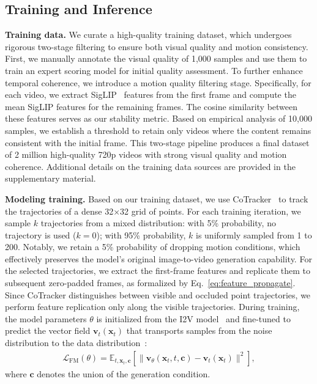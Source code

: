 \documentclass{article}
\begin{document}
\subsection{Training and Inference} \label{sec:details}
\noindent \textbf{Training data.}
We curate a high-quality training dataset, which undergoes rigorous two-stage filtering to ensure both visual quality and motion consistency. First, we manually annotate the visual quality of 1,000 samples and use them to train an expert scoring model for initial quality assessment. To further enhance temporal coherence, we introduce a motion quality filtering stage. Specifically, for each video, we extract SigLIP~\cite{zhai2023siglip} features from the first frame and compute the mean SigLIP features for the remaining frames. The cosine similarity between these features serves as our stability metric. Based on empirical analysis of 10,000 samples, we establish a threshold to retain only videos where the content remains consistent with the initial frame. This two-stage pipeline produces a final dataset of 2 million high-quality 720p videos with strong visual quality and motion coherence. Additional details on the training data sources are provided in the supplementary material.


\noindent \textbf{Modeling training.}
Based on our training dataset, we use CoTracker~\cite{karaev2024cotracker} to track the trajectories of a dense 32×32 grid of points. For each training iteration, we sample $k$ trajectories from a mixed distribution: with 5\% probability, no trajectory is used ($k=0$); with 95\% probability, $k$ is uniformly sampled from 1 to 200.
Notably, we retain a 5\% probability of dropping motion conditions, which effectively preserves the model’s original image-to-video generation capability.
For the selected trajectories, we extract the first-frame features and replicate them to subsequent zero-padded frames, as formalized by Eq.~\eqref{eq:feature_propagate}.
Since CoTracker distinguishes between visible and occluded point trajectories, we perform feature replication only along the visible trajectories.
During training, the model parameters $\theta$ is initialized from the I2V model~\cite{wan} and fine-tuned to predict the vector field $\mathbf{v}_t(\mathbf{x}_t)$ that transports samples from the noise distribution to the data distribution~\cite{lipman2022flowmatching}:
\begin{align}  \label{eq:fm_objective}
    \mathcal{L}_{\text{FM}}(\theta) = \mathbb{E}_{t, \mathbf{x}_t, \textbf{c}} \left[ \| \mathbf{v}_\theta(\mathbf{x}_t, t, \textbf{c}) - \mathbf{v}_t(\mathbf{x}_t) \|^2 \right],  
\end{align}
where $\textbf{c}$ denotes the union of the generation condition.
\end{document}
